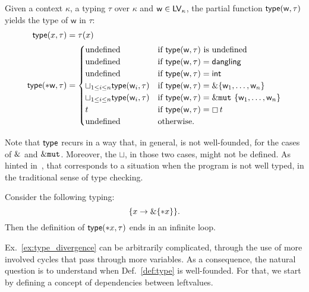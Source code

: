 \begin{definition}\label{def:type}
  Given a context $\kappa$, a typing $\tau$ over $\kappa$
  and $\mathsf{w}\in\mathsf{LV}_\kappa$, the partial function
  $\mathsf{type}(\mathsf{w},\tau)$ yields the type of $\mathsf{w}$ in $\tau$:
  \begin{align*}
    \mathsf{type}(x,\tau)&=\tau(x)\\
    \mathsf{type}(*\mathsf{w},\tau)&=\begin{cases}
    \text{undefined} & \text{if $\mathsf{type}(\mathsf{w},\tau)$ is undefined}\\
    \text{undefined} & \text{if $\mathsf{type}(\mathsf{w},\tau)=\mathsf{dangling}$}\\
    \text{undefined} & \text{if $\mathsf{type}(\mathsf{w},\tau)=\mathsf{int}$}\\
    \sqcup_{1\le i\le n}\mathsf{type}(\mathsf{w}_i,\tau) & \text{if $\mathsf{type}(\mathsf{w},\tau)=\&\{\mathsf{w}_1,\ldots,\mathsf{w}_n\}$}\\
    \sqcup_{1\le i\le n}\mathsf{type}(\mathsf{w}_i,\tau) & \text{if $\mathsf{type}(\mathsf{w},\tau)=\&\mathtt{mut}\ \{\mathsf{w}_1,\ldots,\mathsf{w}_n\}$}\\
    t & \text{if $\mathsf{type}(\mathsf{w},\tau)=\boxempty\,{t}$}\\
    \text{undefined} & \text{otherwise.}
    \end{cases}
  \end{align*}
\end{definition}

\noindent
Note that $\mathsf{type}$ recurs in a way that, in general,
is not well-founded, for the cases of $\&$ and $\&\mathtt{mut}$.
Moreover, the $\sqcup$, in those two cases, might not be defined.
As hinted in~\cite{Pearce21}, that corresponds to a situation when the program
is not well typed, in the traditional sense of type checking.

\begin{example}\label{ex:type_divergence}
  Consider the following typing:
  \[
  \{x\to\&\{\mathtt{*}x\}\}.
  \]
  Then the definition of $\mathsf{type}(\mathtt{*}x,\tau)$ ends in an infinite loop.
\end{example}

\noindent
Ex.~\ref{ex:type_divergence} can be arbitrarily complicated, through the
use of more involved cycles that pass through more variables. As a consequence,
the natural question is to understand when Def.~\ref{def:type} is well-founded.
For that, we start by defining a concept of dependencies between leftvalues.

